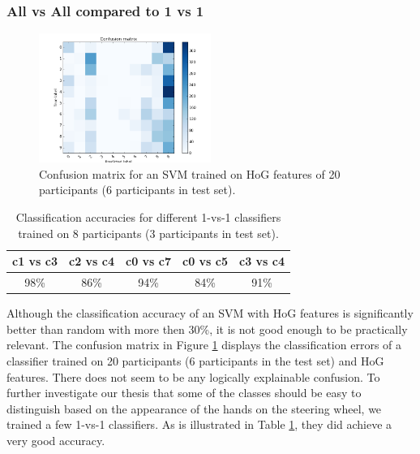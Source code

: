 \documentclass[10pt,twocolumn,letterpaper]{article}
\begin{document}
	\subsubsection{All vs All compared to 1 vs 1}
	\begin{figure}[h]
		\centering
		\includegraphics[width=0.5\textwidth]{handpose_plot_20p_c9}
		\caption{Confusion matrix for an SVM trained on HoG features of 20 participants (6 participants in test set).}
		\label{hand_estimation_cm}
	\end{figure}
	\begin{table}
		\begin{tabular}{c|c|c|c|c}
			c1 vs c3 & c2 vs c4 & c0 vs c7 & c0 vs c5 & c3 vs c4 \\ 
			\hline 
			98\% & 86\% & 94\% & 84\% & 91\% \\ 
		\end{tabular} 
		\caption{Classification accuracies for different 1-vs-1 classifiers trained on 8 participants (3 participants in test set).}
		\label{hand_estimation_1vs1}
	\end{table}
	Although the classification accuracy of an SVM with HoG features is significantly better than random with more then 30\%, it is not good enough to be practically relevant. The confusion matrix in Figure \ref{hand_estimation_cm} displays the classification errors of a classifier trained on 20 participants (6 participants in the test set) and HoG features. There does not seem to be any logically explainable confusion. To further investigate our thesis that some of the classes should be easy to distinguish based on the appearance of the hands on the steering wheel, we trained a few 1-vs-1 classifiers. As is illustrated in Table \ref{hand_estimation_1vs1}, they did achieve a very good accuracy. 
	
	
\end{document}
